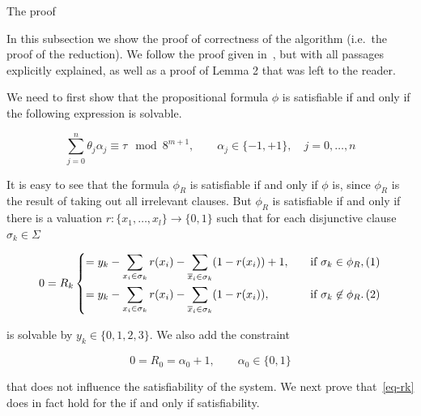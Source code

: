 \documentclass{amsart}
\makeatletter
\def\subsection{\@startsection{subsection}{3}%
  \z@{.5\linespacing\@plus.7\linespacing}{.1\linespacing}%
  {\normalfont}}
\newcommand{\ov}{\overline}
\theoremstyle{plain}
\makeatother
\begin{document}
\subsection{The proof}

In this subsection we show the proof of correctness of the algorithm (i.e.\ the proof of the
reduction). We follow the proof given in~\cite{qcp2}, but with all passages explicitly explained,
as well as a proof of Lemma 2 that was left to the reader.

We need to first show that the propositional formula $\phi$ is satisfiable if and only if the
following expression is solvable.

\begin{equation*}
  \sum_{j=0}^n \theta_j\alpha_j\equiv\tau\mod 8^{m+1},\qquad\alpha_j\in\{-1,+1\},\quad j=0,\ldots,n
\end{equation*}

It is easy to see that the formula $\phi_R$ is satisfiable if and only if $\phi$ is, since $\phi_R$
is the result of taking out all irrelevant clauses. But $\phi_R$ is satisfiable if and only if
there is a valuation $r:\{x_1,\ldots,x_l\}\to\{0,1\}$ such that for each disjunctive clause
$\sigma_k\in\Sigma$

\begin{equation}\label{eq-rk}
  0 = R_k
  \begin{dcases}
    =y_k-\sum_{x_i\in\sigma_k} r(x_i)-\sum_{\ov{x}_i\in\sigma_k} (1-r(x_i))+1, \quad&\text{if }
    \sigma_k\in\phi_R,\hfill(1)\\
    =y_k-\sum_{x_i\in\sigma_k} r(x_i)-\sum_{\ov{x}_i\in\sigma_k} (1-r(x_i)), \quad&\text{if }
    \sigma_k\not\in\phi_R.\hfill(2)
  \end{dcases}
\end{equation}

is solvable by $y_k\in\{0,1,2,3\}$. We also add the constraint

\begin{equation*}
  0 = R_0 = \alpha_0 + 1, \qquad \alpha_0\in\{0, 1\}
\end{equation*}

that does not influence the satisfiability of the system. We next prove that~\autoref{eq-rk} does
in fact hold for the if and only if satisfiability.
\end{document}
